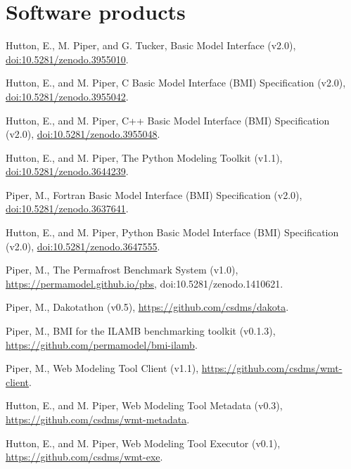 \section{Software products}
\vspace{0.5em}

\begin{enumerate}[{[}1{]}]

  \item Hutton, E., M. Piper, and G. Tucker, Basic Model Interface
    (v2.0), \url{doi:10.5281/zenodo.3955010}.

  \item Hutton, E., and M. Piper, C Basic Model Interface (BMI)
    Specification (v2.0), \url{doi:10.5281/zenodo.3955042}.

  \item Hutton, E., and M. Piper, C++ Basic Model Interface (BMI)
    Specification (v2.0), \url{doi:10.5281/zenodo.3955048}.

  \item Hutton, E., and M. Piper, The Python Modeling Toolkit
    (v1.1), \url{doi:10.5281/zenodo.3644239}.

  \item Piper, M., Fortran Basic Model Interface (BMI) Specification (v2.0),
    \url{doi:10.5281/zenodo.3637641}.

  \item Hutton, E., and M. Piper, Python Basic Model Interface (BMI)
    Specification (v2.0), \url{doi:10.5281/zenodo.3647555}.

  \item Piper, M., The Permafrost Benchmark System (v1.0),
    \url{https://permamodel.github.io/pbs},
    {doi:10.5281/zenodo.1410621}.

  \item Piper, M., Dakotathon (v0.5),
    \url{https://github.com/csdms/dakota}.

  \item Piper, M., BMI for the ILAMB benchmarking toolkit (v0.1.3),
    \url{https://github.com/permamodel/bmi-ilamb}.

  \item Piper, M., Web Modeling Tool Client (v1.1),
    \url{https://github.com/csdms/wmt-client}.

  \item Hutton, E., and M. Piper, Web Modeling Tool Metadata (v0.3),
    \url{https://github.com/csdms/wmt-metadata}.

  \item Hutton, E., and M. Piper, Web Modeling Tool Executor (v0.1),
    \url{https://github.com/csdms/wmt-exe}.


\end{enumerate}
